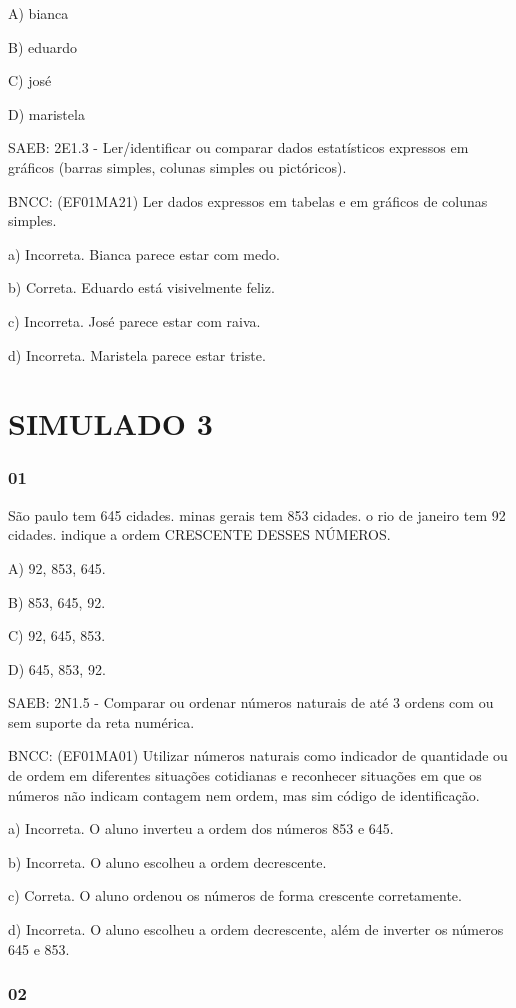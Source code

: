 A) bianca

B) eduardo

C) josé

D) maristela

SAEB: 2E1.3 - Ler/identificar ou comparar dados estatísticos expressos
em gráficos (barras simples, colunas simples ou pictóricos).

BNCC: (EF01MA21) Ler dados expressos em tabelas e em gráficos de colunas
simples.

a) Incorreta. Bianca parece estar com medo.

b) Correta. Eduardo está visivelmente feliz.

c) Incorreta. José parece estar com raiva.

d) Incorreta. Maristela parece estar triste.

\section{SIMULADO 3}\label{simulado-3}

\subsubsection{01 }\label{section-117}

São paulo tem 645 cidades. minas gerais tem 853 cidades. o rio de
janeiro tem 92 cidades. indique a ordem CRESCENTE DESSES NÚMEROS.

A) 92, 853, 645.

B) 853, 645, 92.

C) 92, 645, 853.

D) 645, 853, 92.

SAEB: 2N1.5 - Comparar ou ordenar números naturais de até 3 ordens com
ou sem suporte da reta numérica.

BNCC: (EF01MA01) Utilizar números naturais como indicador de quantidade
ou de ordem em diferentes situações cotidianas e reconhecer situações em
que os números não indicam contagem nem ordem, mas sim código de
identificação.

a) Incorreta. O aluno inverteu a ordem dos números 853 e 645.

b) Incorreta. O aluno escolheu a ordem decrescente.

c) Correta. O aluno ordenou os números de forma crescente corretamente.

d) Incorreta. O aluno escolheu a ordem decrescente, além de inverter os
números 645 e 853.

\subsubsection{02 }\label{section-118}

